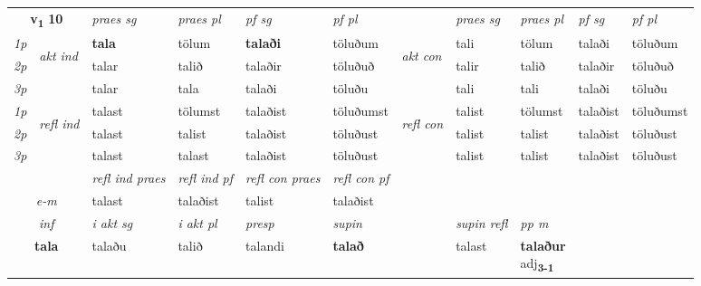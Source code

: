\noindent
\begin{tabular}{lllllllllll} \toprule
\multicolumn{2}{c}{\textbf{v{\textsubscript{1}}} \Large{\textbf{10}}}  &  \textit{praes sg}  & \textit{praes pl}  &\textit{ pf sg} & \textit{pf pl} &  &  \textit{praes sg}  & \textit{praes pl}  & \textit{pf sg} & \textit{pf pl } \\*
	\cmidrule{3-6} \cmidrule{8-11}
 {\textit{1p}} & \multirow{3}{*}{\begin{turn}{90}\textit{akt ind}\end{turn}} & \textbf{tala} & tölum & \textbf{talaði} & töluðum & \multirow{3}{*}{\begin{turn}{90}\textit{akt con}\end{turn}} &tali & tölum & talaði & töluðum\\*
 {\textit{2p}} &  &  talar  & talið & talaðir & töluðuð & & talir & talið & talaðir & töluðuð \\*
{\textit{3p}} &  & talar & tala & talaði & töluðu & & tali & tali& talaði & töluðu \\*
\cmidrule{3-6} \cmidrule{8-11}
 {\textit{1p}} & \multirow{3}{*}{\begin{turn}{90}\textit{refl ind}\end{turn}}  & talast & tölumst & talaðist & töluðumst & \multirow{3}{*}{\begin{turn}{90}\textit{refl con}\end{turn}}  &talist & tölumst & talaðist & töluðumst \\*
 {\textit{2p}} &  & talast & talist & talaðist & töluðust & &talist & talist & talaðist & töluðust \\*
 {\textit{3p}}  & & talast & talast & talaðist & töluðust & & talist & talist& talaðist & töluðust \\*
\cmidrule{3-6} \cmidrule{8-11}

 & & \textit{refl ind praes} & \textit{refl ind pf} & \textit{refl con praes} & \textit{refl con pf} \\*
 \multicolumn{2}{c}{ \textit{e-m} }& talast & talaðist & talist & talaðist \\*

\cmidrule{3-9}
   \multicolumn{2}{c}{\textit{inf}}  & \textit{i akt sg} & \textit{i akt pl}   & \textit{presp} & \textit{supin} && \textit{supin refl} & \textit{pp m} \\*
  \multicolumn{2}{c}{\textbf{tala}} & talaðu  & talið   & talandi &  \textbf{talað} && talast & \specialcell{\textbf{talaður} \\ adj\textbf{\textsubscript{3-1}}} \\*
\end{tabular}

